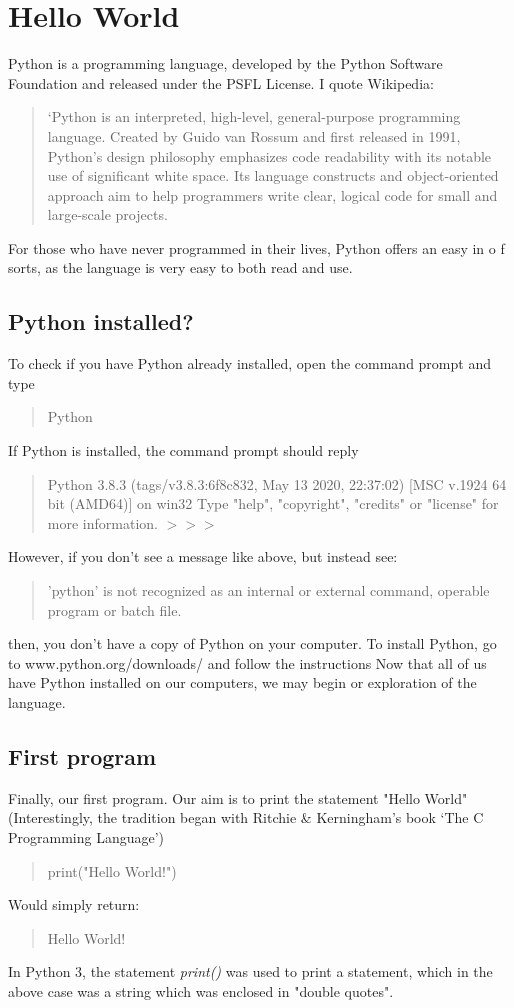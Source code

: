 \chapter{Hello World}
Python is a programming language, developed by the Python Software Foundation and released under the PSFL License. I quote Wikipedia:
\begin{quotation}
`Python is an interpreted, high-level, general-purpose programming language. Created by Guido van Rossum and first released in 1991, Python's design philosophy emphasizes code readability with its notable use of significant white space. Its language constructs and object-oriented approach aim to help programmers write clear, logical code for small and large-scale projects.
\end{quotation}
For those who have never programmed in their lives, Python offers an easy in o f sorts, as the language is very easy to both read and use.
\section{Python installed?}
To check if you have Python already installed, open the command prompt and type \begin{quote}
Python
\end{quote}
If Python is installed, the command prompt should reply
\begin{quote}
Python 3.8.3 (tags/v3.8.3:6f8c832, May 13 2020, 22:37:02) [MSC v.1924 64 bit (AMD64)] on win32\newline 
Type "help", "copyright", "credits" or "license" for more information.\newline 
$>>>$
\end{quote}
However, if you don't see a message like above, but instead see:
\begin{quote}
'python' is not recognized as an internal or external command,\newline 
operable program or batch file.
\end{quote}
then, you don't have a copy of Python on your computer.
To install Python, go to www.python.org/downloads/ and follow the instructions\newline 
Now that all of us have Python installed on our computers, we may begin or exploration of the language.
\section{First program}
Finally, our first program. Our aim is to print the statement "Hello World" (Interestingly, the tradition began with Ritchie \& Kerningham's book `The C Programming Language')\begin{quote}
print("Hello World!")
\end{quote}
Would simply return:
\begin{quote}
Hello World!
\end{quote}
In Python 3, the statement \emph{print()} was used to print a statement, which in the above case was a string which was enclosed in "double quotes". 
